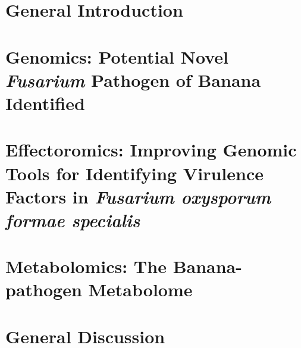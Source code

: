 \documentclass[11pt, a4paper, titles]{report}  %
\begin{document}
\clearpage

\setcounter{secnumdepth}{2}

      
\renewcommand{\arraystretch}{1.5} %

    
\chapter{General Introduction}\label{Chap1}
    
    
\chapter{Genomics: Potential Novel \textit{Fusarium} Pathogen of Banana Identified}\label{Chap2}
    
    
\chapter{Effectoromics: Improving Genomic Tools for Identifying Virulence Factors in   \textit{Fusarium oxysporum formae specialis}}\label{Chap3}
     
    
\chapter{Metabolomics: The Banana-pathogen Metabolome}\label{Chap4}

\chapter{General Discussion}\label{Chap5}


\end{document}

